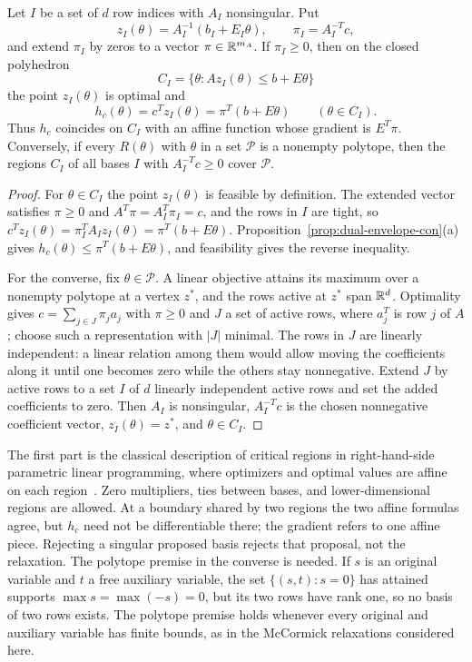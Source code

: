 \begin{proposition}\label{prop:basis-region-con}
Let $I$ be a set of $d$ row indices with $A_I$ nonsingular. Put
\[
 z_I(\theta)=A_I^{-1}(b_I+E_I\theta),\qquad
 \pi_I=A_I^{-T}c,
\]
and extend $\pi_I$ by zeros to a vector $\pi\in\mathbb{R}^{m_A}$. If $\pi_I\ge0$,
then on the closed polyhedron
\[
 C_I=\{\theta:Az_I(\theta)\le b+E\theta\}
\]
the point $z_I(\theta)$ is optimal and
\begin{equation}\label{eq:basis-value-con}
 h_c(\theta)=c^Tz_I(\theta)=\pi^T(b+E\theta)\qquad(\theta\in C_I).
\end{equation}
Thus $h_c$ coincides on $C_I$ with an affine function whose gradient is
$E^T\pi$. Conversely, if every $R(\theta)$ with $\theta$ in a set
$\mathcal P$ is a nonempty polytope, then the regions $C_I$ of all bases
$I$ with $A_I^{-T}c\ge0$ cover $\mathcal P$.
\end{proposition}

\begin{proof}
For $\theta\in C_I$ the point $z_I(\theta)$ is feasible by definition.
The extended vector satisfies $\pi\ge0$ and $A^T\pi=A_I^T\pi_I=c$, and the
rows in $I$ are tight, so
$c^Tz_I(\theta)=\pi_I^TA_Iz_I(\theta)=\pi^T(b+E\theta)$.
Proposition~\ref{prop:dual-envelope-con}(a) gives
$h_c(\theta)\le\pi^T(b+E\theta)$, and feasibility gives the reverse
inequality.

For the converse, fix $\theta\in\mathcal P$. A linear objective attains its
maximum over a nonempty polytope at a vertex $z^*$, and the rows active at
$z^*$ span $\mathbb{R}^d$. Optimality gives $c=\sum_{j\in J}\pi_ja_j$ with
$\pi\ge0$ and $J$ a set of active rows, where $a_j^T$ is row $j$ of $A$;
choose such a representation with $|J|$ minimal. The rows in $J$ are
linearly independent: a linear relation among them would allow moving the
coefficients along it until one becomes zero while the others stay
nonnegative. Extend $J$ by active rows to a set $I$ of $d$ linearly
independent active rows and set the added coefficients to zero. Then $A_I$
is nonsingular, $A_I^{-T}c$ is the chosen nonnegative coefficient vector,
$z_I(\theta)=z^*$, and $\theta\in C_I$.
\end{proof}

The first part is the classical description of critical regions in
right-hand-side parametric linear programming, where optimizers and optimal
values are affine on each region~\cite{borrelli2003parametric}. Zero
multipliers, ties between bases, and lower-dimensional regions are
allowed. At a boundary shared by two regions the two affine formulas agree,
but $h_c$ need not be differentiable there; the gradient refers to one
affine piece. Rejecting a singular proposed basis rejects that proposal,
not the relaxation. The polytope premise in the converse is needed. If $s$
is an original variable and $t$ a free auxiliary variable, the set
$\{(s,t):s=0\}$ has attained supports $\max s=\max(-s)=0$, but its two
rows have rank one, so no basis of two rows exists. The polytope premise
holds whenever every original and auxiliary variable has finite bounds, as
in the McCormick relaxations considered here.

